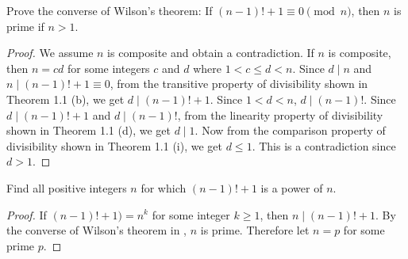 \begin{exercise}{5.7}
  \label{ex-1.1}
  Prove the converse of Wilson's theorem: If \( (n - 1)! + 1 \equiv 0
  \pmod{n} \), then \( n \) is prime if \( n > 1 \).
\end{exercise}

\begin{proof}
  We assume \( n \) is composite and obtain a contradiction. If \( n
  \) is composite, then \( n = cd \) for some integers \( c \) and \(
  d \) where \( 1 < c \le d < n \). Since \( d \mid n \) and \( n \mid
  (n - 1)! + 1 \equiv 0 \), from the transitive property of
  divisibility shown in Theorem 1.1 (b), we get \( d \mid (n - 1)! + 1
  \). Since \( 1 < d < n \), \( d \mid (n - 1)! \). Since \( d \mid (n
  - 1)! + 1 \) and \( d \mid (n - 1)! \), from the linearity property
  of divisibility shown in Theorem 1.1 (d), we get \( d \mid 1 \). Now
  from the comparison property of divisibility shown in Theorem 1.1
  (i), we get \( d \le 1 \). This is a contradiction since \( d > 1
  \).
\end{proof}


\begin{exercise}{5.8}
  Find all positive integers \( n \) for which \( (n - 1)! + 1 \) is a
  power of \( n \).
\end{exercise}

\begin{proof}
  If \( (n - 1)! + 1 ) = n^k \) for some integer \( k \ge 1 \), then
  \( n \mid (n - 1)! + 1 \). By the converse of Wilson's theorem in
  , \( n \) is prime. Therefore let \(
  n = p \) for some prime \( p \).
\end{proof}
